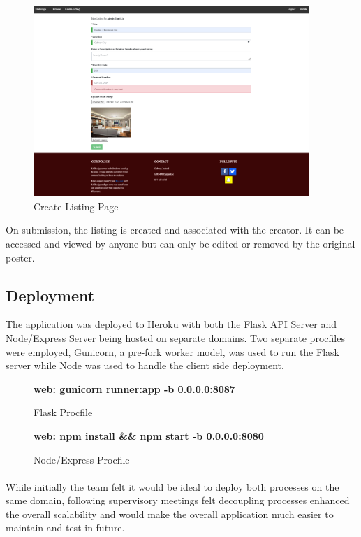 \begin{figure}[H]
	\caption{Create Listing Page}
	\label{image:userprofile}
	\centering
	\includegraphics[width=0.93\textwidth]{images/new_listing.png}
\end{figure}

On submission, the listing is created and associated with the creator. It can be accessed and viewed by anyone but can only be edited or removed by the original poster. 

\subsection{Deployment}
The application was deployed to Heroku with both the Flask API Server and Node/Express Server being hosted on separate domains. Two separate procfiles were employed, Gunicorn, a pre-fork worker model, was used to run the Flask server while Node was used to handle the client side deployment.

\begin{figure}[H]
    \centering
    \textbf{web: gunicorn runner:app -b 0.0.0.0:8087}
    \caption{Flask Procfile}
    \label{image:honchoProcfile}
\end{figure}

\begin{figure}[H]
    \centering
    \textbf{web: npm install \&\& npm start -b 0.0.0.0:8080}
    \caption{Node/Express Procfile}
    \label{image:honchoProcfile}
\end{figure}

\paragraph{}
While initially the team felt it would be ideal to deploy both processes on the same domain, following supervisory meetings felt decoupling processes enhanced the overall scalability and would make the overall application much easier to maintain and test in future.

